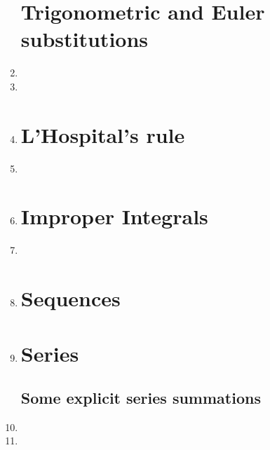 \documentclass{article}
\begin{document}
\begin{enumerate}
\section{Trigonometric and Euler substitutions}
\item 

\item 
\item 



\section{L'Hospital's rule}
\item 

\item 
\section{Improper Integrals}
\item 

\item 

\section{Sequences}
\item 

\section{Series}
\subsection{Some explicit series summations}
\item 
\item 



\end{enumerate}
\end{document}
